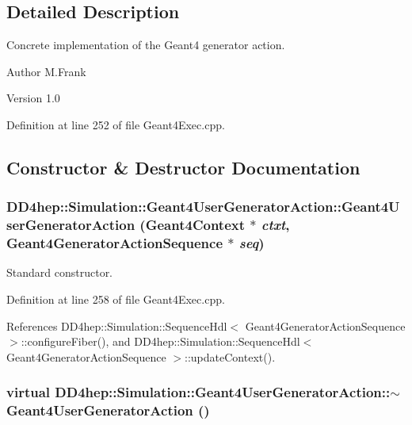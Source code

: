 \subsection{Detailed Description}
Concrete implementation of the Geant4 generator action. \begin{DoxyAuthor}{Author}
M.Frank 
\end{DoxyAuthor}
\begin{DoxyVersion}{Version}
1.0 
\end{DoxyVersion}


Definition at line 252 of file Geant4Exec.cpp.

\subsection{Constructor \& Destructor Documentation}
\hypertarget{class_d_d4hep_1_1_simulation_1_1_geant4_user_generator_action_afc51c8fd156ae7c8a344d1378c2b2026}{
\subsubsection[{Geant4UserGeneratorAction}]{\setlength{\rightskip}{0pt plus 5cm}DD4hep::Simulation::Geant4UserGeneratorAction::Geant4UserGeneratorAction ({\bf Geant4Context} $\ast$ {\em ctxt}, \/  {\bf Geant4GeneratorActionSequence} $\ast$ {\em seq})}}
\label{class_d_d4hep_1_1_simulation_1_1_geant4_user_generator_action_afc51c8fd156ae7c8a344d1378c2b2026}


Standard constructor. 

Definition at line 258 of file Geant4Exec.cpp.

References DD4hep::Simulation::SequenceHdl$<$ Geant4GeneratorActionSequence $>$::configureFiber(), and DD4hep::Simulation::SequenceHdl$<$ Geant4GeneratorActionSequence $>$::updateContext().\hypertarget{class_d_d4hep_1_1_simulation_1_1_geant4_user_generator_action_a4fa904700f82d5bcce7a2c5d774d529f}{
\subsubsection[{$\sim$Geant4UserGeneratorAction}]{\setlength{\rightskip}{0pt plus 5cm}virtual DD4hep::Simulation::Geant4UserGeneratorAction::$\sim$Geant4UserGeneratorAction ()}}
\label{class_d_d4hep_1_1_simulation_1_1_geant4_user_generator_action_a4fa904700f82d5bcce7a2c5d774d529f}


